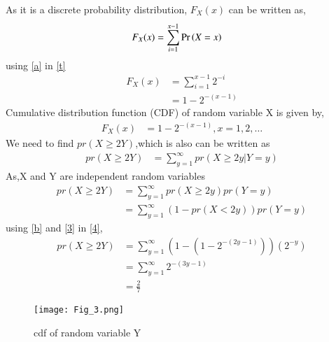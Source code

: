 \documentclass[journal,12pt,twocolumn]{IEEEtran}
\begin{document}
As it is a discrete probability distribution, $F_X(x)$ can be written as,
\begin{align}
    F_X(x)&= \sum_{i=1}^{x-1}\Pr\left(X=x\right) 
\end{align}\label{t}
using \eqref{a} in \eqref{t}
\begin{align}
    F_X(x)&=\sum_{i=1}^{x-1}2^{-i}\\
         &=1-2^{-(x-1)} 
\end{align}
Cumulative distribution function (CDF) of random variable X is given by,
\begin{align}
    F_X(x)&=1-2^{-(x-1)} ,x=1,2,\dots
\end{align} \label{3}
We need to find $pr(X\ge 2Y)$,which is also can be written as
\begin{align}
    pr(X\ge 2Y) &=\sum_{y=1}^{\infty}pr(X \ge 2y|Y=y)
\end{align}
As,X and Y are independent random variables
\begin{align}
    pr(X\ge 2Y) &=\sum_{y=1}^{\infty}pr(X \ge 2y)pr(Y=y)\\
               &=\sum_{y=1}^{\infty}(1-pr(X < 2y))pr(Y=y) \label{4}
\end{align}
using \eqref{b} and \eqref{3} in \eqref{4},
\begin{align}
pr(X\ge 2Y) &=\sum_{y=1}^{\infty}(1-(1-2^{-(2y-1)}))(2^{-y})\\
           &=\sum_{y=1}^{\infty}2^{-(3y-1)}\\
               &=\frac{2}{7}
\end{align}
\begin{figure}[ht]
    \centering
    \texttt{[image: Fig\_3.png]}
    \caption{cdf of random variable Y}
    \label{Fig_3}
\end{figure}
\end{document}
